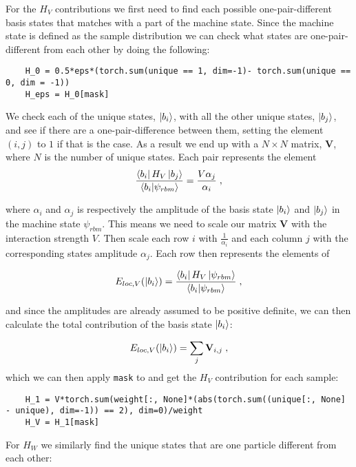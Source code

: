 For the $H_V$ contributions we first need to find each possible one-pair-different basis states that matches with a part of the machine state. Since the machine state is defined as the sample distribution we can check what states are one-pair-different from each other by doing the following:

\begin{verbatim} 
    H_0 = 0.5*eps*(torch.sum(unique == 1, dim=-1)- torch.sum(unique == 0, dim = -1))
    H_eps = H_0[mask]
\end{verbatim}

We check each of the unique states, $\ket{b_i}$, with all the other unique states, $\ket{b_j}$, and see if there are a one-pair-difference between them, setting the element $\left (i, j \right )$ to $1$ if that is the case. As a result we end up with a $N\times N$ matrix, $\mathbf{V}$, where $N$ is the number of unique states. Each pair represents the element
\begin{equation}
  \frac{\bra{b_i}H_V\ket{b_j}}{\braket{b_i}{\psi_{rbm}}} = \frac{V\alpha_j}{\alpha_i} \; ,
  \label{eq:LMG_imp_V_cont}
\end{equation}

where $\alpha_i$ and $\alpha_j$ is respectively the amplitude of the basis state $\ket{b_i}$ and $\ket{b_j}$ in the machine state $\psi_{rbm}$. This means we need to scale our matrix $\mathbf{V}$ with the interaction strength $V$. Then scale each row $i$ with $\frac{1}{\alpha_i}$ and each column $j$ with the corresponding states amplitude $\alpha_j$. Each row then represents the elements of 

$$ E_{loc, V}(\ket{b_i}) = \frac{\bra{b_i}H_V\ket{\psi_{rbm}}}{\braket{b_i}{\psi_{rbm}}} \; , $$

and since the amplitudes are already assumed to be positive definite, we can then calculate the total contribution of the basis state $\ket{b_i}$:

\begin{equation}
 E_{loc, V}(\ket{b_i})= \sum_j \mathbf{V}_{i,j} \; ,
\end{equation}
which we can then apply \texttt{mask} to and get the $H_V$ contribution for each sample:

\begin{verbatim}
    H_1 = V*torch.sum(weight[:, None]*(abs(torch.sum((unique[:, None] - unique), dim=-1)) == 2), dim=0)/weight
    H_V = H_1[mask]
\end{verbatim}

For $H_W$ we similarly find the unique states that are one particle different from each other:

